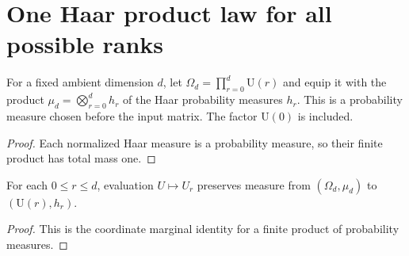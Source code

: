 \section{One Haar product law for all possible ranks}

\begin{definition}
    \label{def:rank_unitary_product_haar}
    \leanok
    For a fixed ambient dimension $d$, let
    $\Omega_d=\prod_{r=0}^d\mathrm U(r)$ and equip it with the product
    $\mu_d=\bigotimes_{r=0}^d h_r$ of the Haar probability measures $h_r$.
    This is a probability measure chosen before the input matrix.
    The factor $\mathrm U(0)$ is included.
\end{definition}
\begin{proof}\leanok
    Each normalized Haar measure is a probability measure, so their
    finite product has total mass one.
\end{proof}

\begin{theorem}
    \label{thm:rank_unitary_haar_marginal}
    \leanok
    For each $0\le r\le d$, evaluation $U\mapsto U_r$ preserves measure
    from $(\Omega_d,\mu_d)$ to $(\mathrm U(r),h_r)$.
\end{theorem}
\begin{proof}\leanok
    This is the coordinate marginal identity for a finite product of
    probability measures.
\end{proof}

